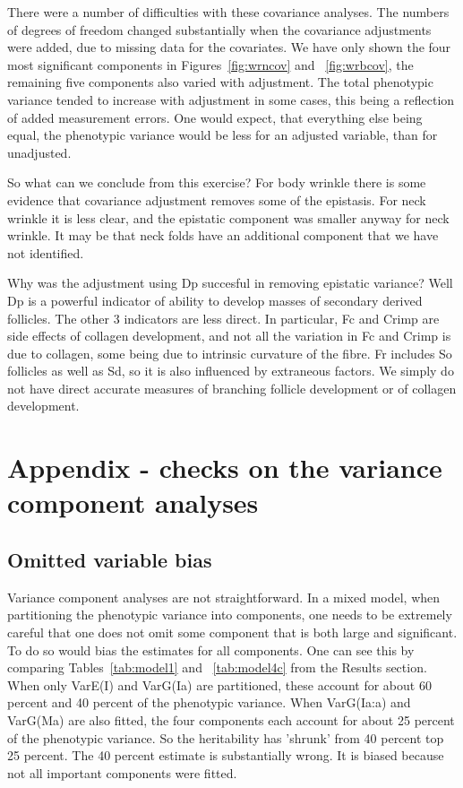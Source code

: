 \documentclass[titlepage]{article}  %
\begin{document}
There were a number of difficulties with these covariance analyses.  The numbers of degrees of freedom changed substantially when the covariance adjustments were added, due to missing data for the covariates.  We have only shown the four most significant components in Figures~\ref{fig:wrncov} and ~\ref{fig:wrbcov}, the remaining five components also varied with adjustment. The total phenotypic variance tended to increase with adjustment in some cases, this being a reflection of added measurement errors. One would expect, that everything else being equal, the phenotypic variance would be less for an adjusted variable, than for unadjusted. 

So what can we conclude from this exercise? For body wrinkle there is some evidence that covariance adjustment removes some of the epistasis. For neck wrinkle it is less clear, and the epistatic component was smaller anyway for neck wrinkle. It may be that neck folds have an additional component that we have not identified. 

Why was the adjustment using Dp succesful in removing epistatic variance? Well Dp is a powerful indicator of ability to develop masses of secondary derived follicles. The other 3 indicators are less direct. In particular, Fc and Crimp are side effects of collagen development, and not all the variation in Fc and Crimp is due to collagen, some being due to intrinsic curvature of the fibre.  Fr includes So follicles as well as Sd, so it is also influenced by extraneous factors. We simply do not have direct accurate measures of branching follicle development or of collagen development.

\section{Appendix - checks on the variance component analyses}
\subsection{Omitted variable bias}
Variance component analyses are not straightforward. In a mixed model, when partitioning the phenotypic variance into components, one needs to be extremely careful that one does not omit some component that is both large and significant. To do so would bias the estimates for all components. One can see this by comparing Tables~\ref{tab:model1} and ~\ref{tab:model4c} from the Results section. When only VarE(I) and VarG(Ia) are partitioned, these account for about 60 percent and 40 percent of the phenotypic variance. When VarG(Ia:a) and VarG(Ma) are also fitted, the four components each account for about 25 percent of the phenotypic variance. So the heritability has 'shrunk' from 40 percent top 25 percent. The 40 percent estimate is substantially wrong. It is biased because not all important components were fitted.
\end{document}
